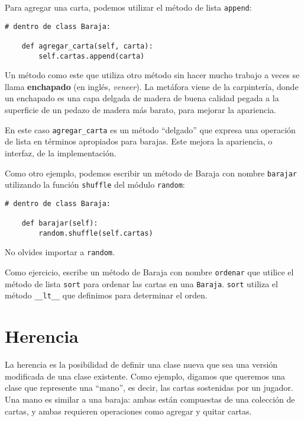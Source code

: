 \documentclass[10pt]{book}
\begin{document}
Para agregar una carta, podemos utilizar el método de lista {\tt append}:

\begin{verbatim}
# dentro de class Baraja:

    def agregar_carta(self, carta):
        self.cartas.append(carta)
\end{verbatim}
%
Un método como este que utiliza otro método sin hacer
mucho trabajo a veces se llama {\bf enchapado} (en inglés, {\em veneer}).  La metáfora
viene de la carpintería, donde un enchapado es una capa
delgada de madera de buena calidad pegada a la superficie de un pedazo de madera
más barato, para mejorar la apariencia.

En este caso \verb"agregar_carta" es un método ``delgado'' que expresa
una operación de lista en términos apropiados para barajas.  Este
mejora la apariencia, o interfaz, de la
implementación.

Como otro ejemplo, podemos escribir un método de Baraja con nombre {\tt barajar} 
utilizando la función {\tt shuffle} del módulo {\tt random}:

\begin{verbatim}
# dentro de class Baraja:

    def barajar(self):
        random.shuffle(self.cartas)
\end{verbatim}
%
No olvides importar a {\tt random}.

Como ejercicio, escribe un método de Baraja con nombre {\tt ordenar} que utilice el
método de lista {\tt sort} para ordenar las cartas en una {\tt Baraja}.  {\tt sort}
utiliza el método \verb"__lt__" que definimos para determinar el orden.
 



\section{Herencia}

La herencia es la posibilidad de definir una clase nueva que sea una versión
modificada de una clase existente.  Como ejemplo, digamos que queremos una
clase que represente una ``mano'', es decir, las cartas sostenidas por un jugador.
Una mano es similar a una baraja: ambas están compuestas de una colección de
cartas, y ambas requieren operaciones como agregar y quitar cartas.
\end{document}
